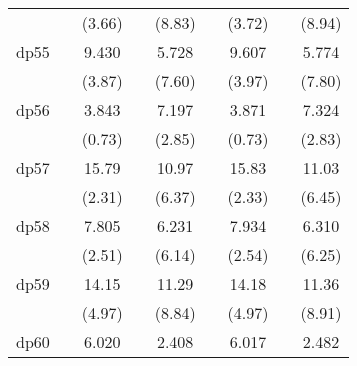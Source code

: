 {\begin{tabular}{l*{8}{c}}
            &                     &      (3.66)         &                     &      (8.83)         &                     &      (3.72)         &                     &      (8.94)         \\
[1em]
dp55        &                     &       9.430\sym{***}&                     &       5.728\sym{***}&                     &       9.607\sym{***}&                     &       5.774\sym{***}\\
            &                     &      (3.87)         &                     &      (7.60)         &                     &      (3.97)         &                     &      (7.80)         \\
[1em]
dp56        &                     &       3.843         &                     &       7.197\sym{**} &                     &       3.871         &                     &       7.324\sym{**} \\
            &                     &      (0.73)         &                     &      (2.85)         &                     &      (0.73)         &                     &      (2.83)         \\
[1em]
dp57        &                     &       15.79\sym{*}  &                     &       10.97\sym{***}&                     &       15.83\sym{*}  &                     &       11.03\sym{***}\\
            &                     &      (2.31)         &                     &      (6.37)         &                     &      (2.33)         &                     &      (6.45)         \\
[1em]
dp58        &                     &       7.805\sym{*}  &                     &       6.231\sym{***}&                     &       7.934\sym{*}  &                     &       6.310\sym{***}\\
            &                     &      (2.51)         &                     &      (6.14)         &                     &      (2.54)         &                     &      (6.25)         \\
[1em]
dp59        &                     &       14.15\sym{***}&                     &       11.29\sym{***}&                     &       14.18\sym{***}&                     &       11.36\sym{***}\\
            &                     &      (4.97)         &                     &      (8.84)         &                     &      (4.97)         &                     &      (8.91)         \\
[1em]
dp60        &                     &       6.020         &                     &       2.408\sym{***}&                     &       6.017         &                     &       2.482\sym{***}\\

\end{tabular}}
